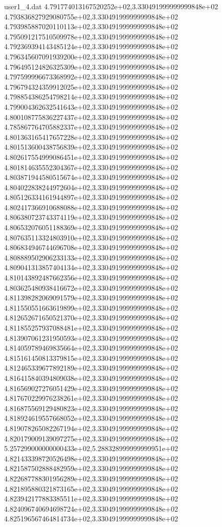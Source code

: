 \begin{filecontents}{user1_4.dat}
4.791774013167520252e+02,3.330491999999999848e+02
4.793836827929080755e+02,3.330491999999999848e+02
4.793985887020110113e+02,3.330491999999999848e+02
4.795091217510509978e+02,3.330491999999999848e+02
4.792369394143485124e+02,3.330491999999999848e+02
4.796345607091939200e+02,3.330491999999999848e+02
4.796495124826325309e+02,3.330491999999999848e+02
4.797599996673368992e+02,3.330491999999999848e+02
4.796794324359912025e+02,3.330491999999999848e+02
4.798854386254798214e+02,3.330491999999999848e+02
4.799004362632541643e+02,3.330491999999999848e+02
4.800108775836227437e+02,3.330491999999999848e+02
4.785867764705882337e+02,3.330491999999999848e+02
4.801363165417657228e+02,3.330491999999999848e+02
4.801513600438756839e+02,3.330491999999999848e+02
4.802617554999086451e+02,3.330491999999999848e+02
4.801814635552304367e+02,3.330491999999999848e+02
4.803871944580515674e+02,3.330491999999999848e+02
4.804022838244972604e+02,3.330491999999999848e+02
4.805126334161944897e+02,3.330491999999999848e+02
4.802417366910688088e+02,3.330491999999999848e+02
4.806380723743374119e+02,3.330491999999999848e+02
4.806532076051188369e+02,3.330491999999999848e+02
4.807635113324803910e+02,3.330491999999999848e+02
4.806834946744696708e+02,3.330491999999999848e+02
4.808889502906233133e+02,3.330491999999999848e+02
4.809041313857404134e+02,3.330491999999999848e+02
4.810143892487662356e+02,3.330491999999999848e+02
4.803625480938416672e+02,3.330491999999999848e+02
4.811398282069091579e+02,3.330491999999999848e+02
4.811550551663619899e+02,3.330491999999999848e+02
4.812652671650521370e+02,3.330491999999999848e+02
4.811855257937088481e+02,3.330491999999999848e+02
4.813907061231950593e+02,3.330491999999999848e+02
4.814059789469835664e+02,3.330491999999999848e+02
4.815161450813379815e+02,3.330491999999999848e+02
4.812465339677892189e+02,3.330491999999999848e+02
4.816415840394809038e+02,3.330491999999999848e+02
4.816569027276051429e+02,3.330491999999999848e+02
4.817670229976238261e+02,3.330491999999999848e+02
4.816875569129480823e+02,3.330491999999999848e+02
4.818924619557668052e+02,3.330491999999999848e+02
4.819078265082267194e+02,3.330491999999999848e+02
4.820179009139097275e+02,3.330491999999999848e+02
5.257299000000000433e+02,5.288328999999999951e+02
4.821433398720526498e+02,3.330491999999999848e+02
4.821587502888482959e+02,3.330491999999999848e+02
4.822687788301956289e+02,3.330491999999999848e+02
4.821895880321873165e+02,3.330491999999999848e+02
4.823942177883385511e+02,3.330491999999999848e+02
4.824096740694698724e+02,3.330491999999999848e+02
4.825196567464814734e+02,3.330491999999999848e+02

\end{filecontents}
